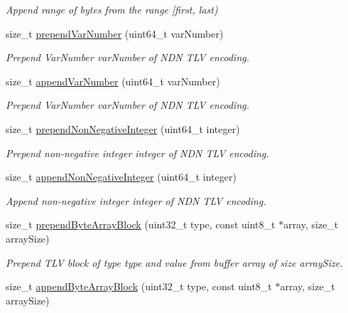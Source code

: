\begin{DoxyCompactItemize}
\begin{DoxyCompactList}\small\item\em Append range of bytes from the range \mbox{[}{\ttfamily first}, {\ttfamily last}) \end{DoxyCompactList}\item 
size\+\_\+t \hyperlink{classndn_1_1encoding_1_1Estimator_ad8d5cc05afe2e7b8a8c8dc52ff0f2526}{prepend\+Var\+Number} (uint64\+\_\+t var\+Number)
\begin{DoxyCompactList}\small\item\em Prepend Var\+Number {\ttfamily var\+Number} of N\+DN T\+LV encoding. \end{DoxyCompactList}\item 
size\+\_\+t \hyperlink{classndn_1_1encoding_1_1Estimator_a42d28118ac2fe7579cd3c8193c0cc8d4}{append\+Var\+Number} (uint64\+\_\+t var\+Number)
\begin{DoxyCompactList}\small\item\em Prepend Var\+Number {\ttfamily var\+Number} of N\+DN T\+LV encoding. \end{DoxyCompactList}\item 
size\+\_\+t \hyperlink{classndn_1_1encoding_1_1Estimator_a41034618ececa932567f1d177bff8873}{prepend\+Non\+Negative\+Integer} (uint64\+\_\+t integer)
\begin{DoxyCompactList}\small\item\em Prepend non-\/negative integer {\ttfamily integer} of N\+DN T\+LV encoding. \end{DoxyCompactList}\item 
size\+\_\+t \hyperlink{classndn_1_1encoding_1_1Estimator_a141127e742121ec02ee8be0597c13293}{append\+Non\+Negative\+Integer} (uint64\+\_\+t integer)
\begin{DoxyCompactList}\small\item\em Append non-\/negative integer {\ttfamily integer} of N\+DN T\+LV encoding. \end{DoxyCompactList}\item 
size\+\_\+t \hyperlink{classndn_1_1encoding_1_1Estimator_ab89fee5df712b133d926ccea15d4e75d}{prepend\+Byte\+Array\+Block} (uint32\+\_\+t type, const uint8\+\_\+t $\ast$array, size\+\_\+t array\+Size)\hypertarget{classndn_1_1encoding_1_1Estimator_ab89fee5df712b133d926ccea15d4e75d}{}\label{classndn_1_1encoding_1_1Estimator_ab89fee5df712b133d926ccea15d4e75d}

\begin{DoxyCompactList}\small\item\em Prepend T\+LV block of type {\ttfamily type} and value from buffer {\ttfamily array} of size {\ttfamily array\+Size}. \end{DoxyCompactList}\item 
size\+\_\+t \hyperlink{classndn_1_1encoding_1_1Estimator_a1ede30aca96662db626e1e687b74f5ba}{append\+Byte\+Array\+Block} (uint32\+\_\+t type, const uint8\+\_\+t $\ast$array, size\+\_\+t array\+Size)\hypertarget{classndn_1_1encoding_1_1Estimator_a1ede30aca96662db626e1e687b74f5ba}{}\label{classndn_1_1encoding_1_1Estimator_a1ede30aca96662db626e1e687b74f5ba}


\end{DoxyCompactItemize}
